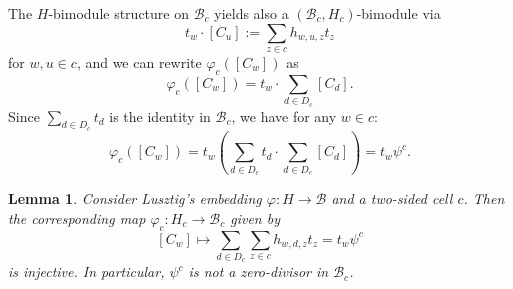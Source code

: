 \documentclass[oneside, a4paper, 11pt]{amsart}
\newcommand{\cB}{\mathcal{B}}
\newtheorem{lemma}[theorem]{Lemma}
\begin{document}
The $H$-bimodule structure on $\cB_c$ yields also a $({\cB}_c, H_c)$-bimodule via
\begin{equation}
t_w\cdot [C_u] :=\sum_{z\in c} h_{w,u,z}t_z
\end{equation}
for $w,u\in c$, and we can rewrite $\varphi_c([C_w])$ as 
\begin{equation}\label{eq:varphi-formula}
\varphi_c([C_w])=t_w\cdot \sum_{d\in D_c} [C_d].
\end{equation}
Since $\sum_{d\in D_c} t_d$ is the identity in ${\cB}_c$, we have for any $w\in c$:
\begin{equation}
\varphi_c([C_w])=t_w\left(\sum_{d\in D_c} t_d \cdot \sum_{d\in D_c} [C_d]\right) = t_w \psi^c.
\end{equation}


\begin{lemma} \label{lemma:phic-injective}
Consider Lusztig's embedding $\varphi: H \to \cB$ and a two-sided cell $c$. Then the corresponding map 
$\varphi_c: H_c \to {\cB}_c$ given by 
$$[C_w]  \mapsto \displaystyle \sum_{d\in D_c} \sum_{z\in c}  h_{w,d,z}t_z = t_w \psi^c$$
is injective. In particular, $\psi^c$ is not a zero-divisor in $\cB_c$.
\end{lemma}
\end{document}
